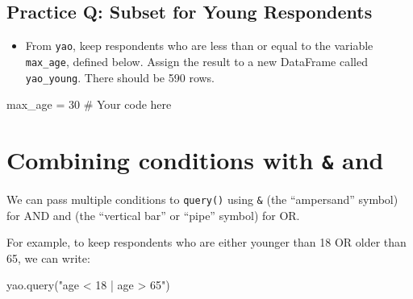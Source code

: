 \documentclass[
  letterpaper,
  DIV=11,
  numbers=noendperiod]{scrreprt}
\newenvironment{Shaded}{\begin{snugshade}}{\end{snugshade}}
\newcommand{\CommentTok}[1]{\textcolor[rgb]{0.37,0.37,0.37}{#1}}
\newcommand{\DecValTok}[1]{\textcolor[rgb]{0.68,0.00,0.00}{#1}}
\newcommand{\NormalTok}[1]{\textcolor[rgb]{0.00,0.23,0.31}{#1}}
\newcommand{\OperatorTok}[1]{\textcolor[rgb]{0.37,0.37,0.37}{#1}}
\newcommand{\StringTok}[1]{\textcolor[rgb]{0.13,0.47,0.30}{#1}}
\providecommand{\tightlist}{%
  \setlength{\itemsep}{0pt}\setlength{\parskip}{0pt}}\usepackage{longtable,booktabs,array}
\begin{document}
\begin{tcolorbox}[enhanced jigsaw, colframe=quarto-callout-tip-color-frame, opacityback=0, titlerule=0mm, bottomrule=.15mm, breakable, leftrule=.75mm, colbacktitle=quarto-callout-tip-color!10!white, title=\textcolor{quarto-callout-tip-color}{\faLightbulb}\hspace{0.5em}{Practice}, rightrule=.15mm, coltitle=black, opacitybacktitle=0.6, colback=white, left=2mm, arc=.35mm, toptitle=1mm, bottomtitle=1mm, toprule=.15mm]

\subsection{Practice Q: Subset for Young
Respondents}\label{practice-q-subset-for-young-respondents}

\begin{itemize}
\tightlist
\item
  From \texttt{yao}, keep respondents who are less than or equal to the
  variable \texttt{max\_age}, defined below. Assign the result to a new
  DataFrame called \texttt{yao\_young}. There should be 590 rows.
\end{itemize}

\begin{Shaded}
\begin{Highlighting}[]
\NormalTok{max\_age }\OperatorTok{=} \DecValTok{30}
\CommentTok{\# Your code here}
\end{Highlighting}
\end{Shaded}

\end{tcolorbox}

\section{\texorpdfstring{Combining conditions with \texttt{\&} and
\texttt{\textbar{}}}{Combining conditions with \& and \textbar{}}}\label{combining-conditions-with-and}

We can pass multiple conditions to \texttt{query()} using \texttt{\&}
(the ``ampersand'' symbol) for AND and \texttt{\textbar{}} (the
``vertical bar'' or ``pipe'' symbol) for OR.

For example, to keep respondents who are either younger than 18 OR older
than 65, we can write:

\begin{Shaded}
\begin{Highlighting}[]
\NormalTok{yao.query(}\StringTok{"age \textless{} 18 | age \textgreater{} 65"}\NormalTok{)}
\end{Highlighting}
\end{Shaded}
\end{document}
